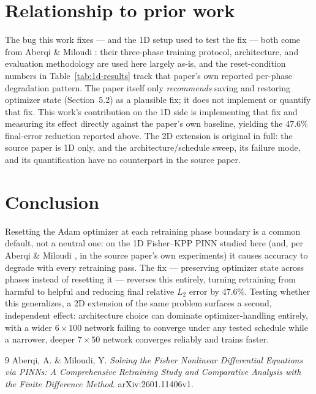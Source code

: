 \documentclass[11pt]{article}
\begin{document}
\section{Relationship to prior work}

The bug this work fixes --- and the 1D setup used to test the fix --- both come from Aberqi \&
Miloudi \cite{aberqi2026fisher}: their three-phase training protocol, architecture, and evaluation
methodology are used here largely as-is, and the reset-condition numbers in Table~\ref{tab:1d-results}
track that paper's own reported per-phase degradation pattern. The paper itself only
\emph{recommends} saving and restoring optimizer state (Section~5.2) as a plausible fix; it does not
implement or quantify that fix. This work's contribution on the 1D side is implementing that fix and
measuring its effect directly against the paper's own baseline, yielding the $47.6\%$ final-error
reduction reported above. The 2D extension is original in full: the source paper is 1D only, and the
architecture/schedule sweep, its failure mode, and its quantification have no counterpart in the source
paper.

\section{Conclusion}

Resetting the Adam optimizer at each retraining phase boundary is a common default, not a neutral one:
on the 1D Fisher--KPP PINN studied here (and, per Aberqi \& Miloudi \cite{aberqi2026fisher}, in the
source paper's own experiments) it causes accuracy to degrade with every retraining pass. The fix ---
preserving optimizer state across phases instead of resetting it --- reverses this entirely, turning
retraining from harmful to helpful and reducing final relative $L_2$ error by $47.6\%$. Testing whether
this generalizes, a 2D extension of the same problem surfaces a second, independent effect: architecture
choice can dominate optimizer-handling entirely, with a wider $6\times100$ network failing to converge
under any tested schedule while a narrower, deeper $7\times50$ network converges reliably and trains
faster.

\begin{thebibliography}{9}
Aberqi, A. \& Miloudi, Y. \emph{Solving the Fisher Nonlinear Differential Equations via PINNs: A
Comprehensive Retraining Study and Comparative Analysis with the Finite Difference Method}.
arXiv:2601.11406v1.
\end{thebibliography}
\end{document}
